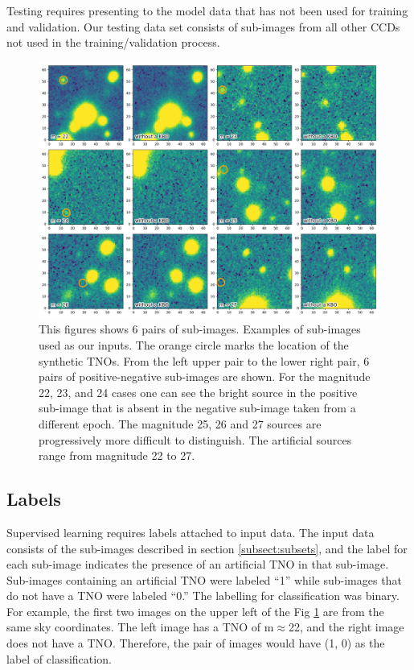 \documentclass{aastex631}
\begin{document}
Testing requires presenting to the model data that has not been used for training and validation. Our testing data set consists of sub-images from all other CCDs not used in the training/validation process. 

\begin{figure}[ht]
    \centering
    \includegraphics[width=\textwidth,keepaspectratio]{Figures/mag_examples.png}
    \caption{This figures shows 6 pairs of sub-images.
    Examples of sub-images used as our inputs. 
    The orange circle marks the location of the synthetic TNOs.
    From the left upper pair to the lower right pair, 6 pairs of positive-negative sub-images are shown.
    For the magnitude 22, 23, and 24 cases one can see the bright source in the positive sub-image that is absent in the negative sub-image taken from a different epoch.
    The magnitude 25, 26 and 27 sources are progressively more difficult to distinguish. 
    The artificial sources range from magnitude 22 to 27.}
    \label{fig:magexamples}
\end{figure}{}

\subsection{Labels}
\label{subsect:labeling}
Supervised learning requires labels attached to input data. 
The input data consists of the sub-images described in section \ref{subsect:subsets}, and the label for each sub-image indicates the presence of an artificial TNO in that sub-image.  
Sub-images containing an artificial TNO were labeled ``1'' while sub-images that do not have a TNO were labeled ``0.'' 
The labelling for classification was binary.
For example, the first two images on the upper left of the Fig \ref{fig:magexamples} are from the same sky coordinates.
The left image has a TNO of m$\approx$22, and the right image does not have a TNO. 
Therefore, the pair of images would have (1, 0) as the label of classification.
\end{document}
